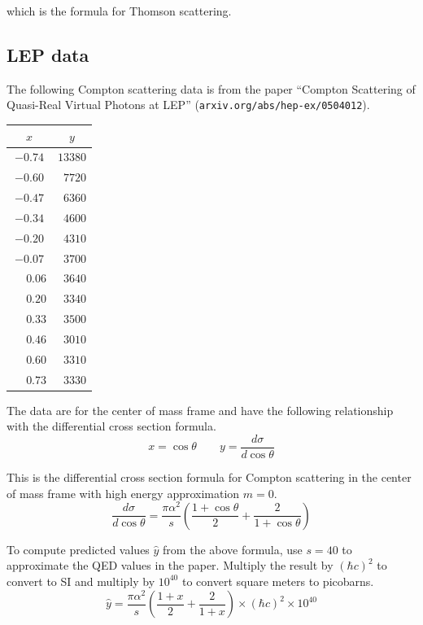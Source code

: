 \documentclass[12pt]{article}
\begin{document}
\noindent
which is the formula for Thomson scattering.

\subsection*{LEP data}
The following Compton scattering data is from the paper
``Compton Scattering of Quasi-Real Virtual Photons at LEP''
(\verb$arxiv.org/abs/hep-ex/0504012$).

\begin{center}
\begin{tabular}{|c|c|}
\hline
$x$ & $y$\\
\hline
$-0.74$ & $13380$\\
$-0.60$ & $\phantom{0}7720$\\
$-0.47$ & $\phantom{0}6360$\\
$-0.34$ & $\phantom{0}4600$\\
$-0.20$ & $\phantom{0}4310$\\
$-0.07$ & $\phantom{0}3700$\\
$\phantom{+}0.06$ & $\phantom{0}3640$\\
$\phantom{+}0.20$ & $\phantom{0}3340$\\
$\phantom{+}0.33$ & $\phantom{0}3500$\\
$\phantom{+}0.46$ & $\phantom{0}3010$\\
$\phantom{+}0.60$ & $\phantom{0}3310$\\
$\phantom{+}0.73$ & $\phantom{0}3330$\\
\hline
\end{tabular}
\end{center}

\noindent
The data are for the center of mass frame and have the following relationship with the differential cross section formula.
\begin{equation*}
x=\cos\theta\qquad y=\frac{d\sigma}{d\cos\theta}
\end{equation*}

\noindent
This is the differential cross section formula for Compton scattering
in the center of mass frame with high energy approximation $m=0$.
\begin{equation*}
\frac{d\sigma}{d\cos\theta}
=\frac{\pi\alpha^2}{s}\left(
\frac{1+\cos\theta}{2}+\frac{2}{1+\cos\theta}
\right)
\end{equation*}

\noindent
To compute predicted values $\hat{y}$ from the above formula,
use $s=40$ to approximate the QED values in the paper.
Multiply the result by $(\hbar c)^2$ to convert to SI
and multiply by $10^{40}$ to convert square meters to picobarns.
\begin{equation*}
\hat{y}
=
\frac{\pi\alpha^2}{s}
\left(
\frac{1+x}{2}+
\frac{2}{1+x}
\right)
\times(\hbar c)^2
\times10^{40}
\end{equation*}
\end{document}
